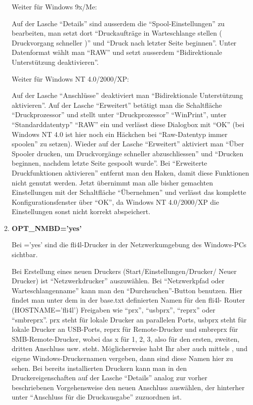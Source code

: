 \begin{enumerate}
    Weiter für Windows 9x/Me:

    Auf der Lasche ``Details'' sind ausserdem die ``Spool-Einstellungen'' zu
    bearbeiten, man setzt dort ``Druckaufträge in Warteschlange stellen (
    Druckvorgang schneller )'' und ``Druck nach letzter Seite beginnen''.
    Unter Datenformat wählt man ``RAW'' und setzt ausserdem ``Bidirektionale
    Unterstützung deaktivieren''.

    Weiter für Windows NT 4.0/2000/XP:

    Auf der Lasche ``Anschlüsse'' deaktiviert man ``Bidirektionale
    Unterstützung aktivieren''. Auf der Lasche ``Erweitert'' betätigt man die
    Schaltfläche ``Druckprozessor'' und stellt unter ``Druckprozessor''
    ``WinPrint'', unter ``Standarddatentyp'' ``RAW'' ein und verlässt diese
    Dialogbox mit ``OK'' (bei Windows NT 4.0 ist hier noch ein Häckchen bei
    ``Raw-Datentyp immer spoolen'' zu setzen). Wieder auf der Lasche
    ``Erweitert'' aktiviert man ``Über Spooler drucken, um Druckvorgänge
    schneller abzuschliessen'' und ``Drucken beginnen, nachdem letzte Seite
    gespoolt wurde''. Bei ``Erweiterte Druckfunktionen aktivieren'' entfernt
    man den Haken, damit diese Funktionen nicht genutzt werden. Jetzt
    übernimmt man alle bisher gemachten Einstellungen mit der Schaltfläche
    ``Übernehmen'' und verlässt das komplette Konfigurationsfenster über ``OK'',
    da Windows NT 4.0/2000/XP die Einstellungen sonst nicht korrekt
    abspeichert.



\item \textbf{OPT\_NMBD='yes'}


    Bei ='yes' sind die fli4l-Drucker in der Netzwerkumgebung des
    Windows-PCs sichtbar.

    Bei Erstellung eines neuen Druckers (Start/Einstellungen/Drucker/ Neuer
    Drucker) ist ``Netzwerkdrucker'' auszuwählen. Bei ``Netzwerkpfad oder
    Warteschlangenname'' kann man den ``Durchsuchen''-Button benutzen. Hier
    findet man unter dem in der base.txt definierten Namen für den fli4l-
    Router (HOSTNAME='fli4l') Freigaben wie ``prx'', ``usbprx'', ``reprx'' oder
    ``smbreprx''.
    prx steht für lokale Drucker an parallelen Ports, usbprx steht für
    lokale Drucker an USB-Ports, reprx für Remote-Drucker und smbreprx für
    SMB-Remote-Drucker, wobei das x für 1, 2, 3, also für den ersten, zweiten,
    dritten Anschluss usw. steht.
    Möglicherweise habt Ihr aber auch mittels ,
     und 
    eigene Windows-Druckernamen vergeben, dann sind diese Namen hier zu sehen.
    Bei bereits installierten Druckern kann man in den Druckereigenschaften auf
    der Lasche ``Details'' analog zur vorher beschriebenen Vorgehensweise den
    neuen Anschluss auswählen, der hinterher unter ``Anschluss für die
    Druckausgabe'' zuzuordnen ist.


\end{enumerate}
